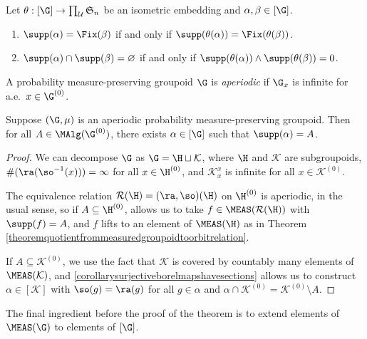 \begin{corollary}\label{corollarysupportssofic}
Let $\theta:[\G]\to\prod_{\mathcal{U}}\mathfrak{S}_n$ be an isometric embedding and $\alpha,\beta\in[\G]$.
\begin{enumerate}
\item[(a)] $\supp(\alpha)=\Fix(\beta)$ if and only if $\supp(\theta(\alpha))=\Fix(\theta(\beta))$.
\item[(b)] $\supp(\alpha)\cap\supp(\beta)=\varnothing$ if and only if $\supp(\theta(\alpha))\land\supp(\theta(\beta))=0$.
\end{enumerate}
\end{corollary}

\begin{definition}
A probability measure-preserving groupoid $\G$ is \emph{aperiodic} if $\G_x$ is infinite for a.e.\ $x\in \G^{(0)}$.
\end{definition}

\begin{lemma}\label{lemmaaperiodicsupport}
Suppose $(\G,\mu)$ is an aperiodic probability measure-preserving groupoid. Then for all $A\in\MAlg(\G^{(0)})$, there exists $\alpha\in[\G]$ such that $\supp(\alpha)=A$.
\end{lemma}
\begin{proof}
We can decompose $\G$ as $\G=\H\sqcup\mathcal{K}$, where $\H$ and $\mathcal{K}$ are subgroupoids, $\#(\ra(\so^{-1}(x)))=\infty$ for all $x\in\H^{(0)}$, and $\mathcal{K}^x_x$ is infinite for all $x\in\mathcal{K}^{(0)}$.

The equivalence relation $\mathcal{R}(\H)=(\ra,\so)(\H)$ on $\H^{(0)}$ is aperiodic, in the usual sense, so if $A\subseteq \H^{(0)}$, \cite[Lemma 4.10]{MR2583950} allows us to take $f\in\MEAS(\mathcal{R}(\H))$ with $\supp(f)=A$, and $f$ lifts to an element of $\MEAS(\H)$ as in Theorem \ref{theoremquotientfrommeasuredgroupoidtoorbitrelation}.

If $A\subseteq\mathcal{K}^{(0)}$, we use the fact that $\mathcal{K}$ is covered by countably many elements of $\MEAS(\mathcal{K})$, and \ref{corollarysurjectiveborelmapshavesections} allows us to construct $\alpha\in[\mathcal{K}]$ with $\so(g)=\ra(g)$ for all $g\in\alpha$ and $\alpha\cap \mathcal{K}^{(0)}=\mathcal{K}^{(0)}\setminus A$.\qedhere
\end{proof}

The final ingredient before the proof of the theorem is to extend elements of $\MEAS(\G)$ to elements of $[\G]$.

